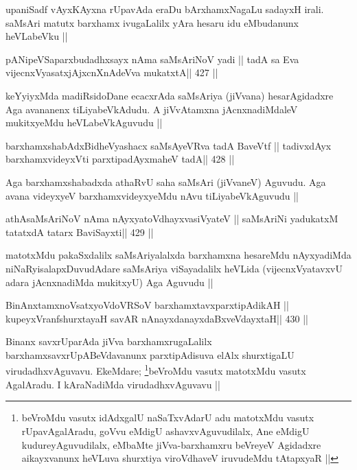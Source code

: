 \begin{artha}
upaniSadf vAyxKAyxna rUpavAda eraDu bArxhamxNagaLu sadayxH irali.
saMsAri matutx barxhamx ivugaLalilx yAra hesaru idu eMbudanunx
heVLabeVku ||
\end{artha}

\begin{shl}
pANipeVSaparxbudadhxsayx nAma saMsAriNoV yadi ||
tadA sa Eva vijecnxVyasatxjAjxcnXnAdeVva mukatxtA\hfill || 427 ||
\end{shl}

\begin{artha}
keYyiyxMda madiRsidoDane ecacxrAda saMsAriya (jiVvana) hesarAgidadxre
Aga avananenx tiLiyabeVkAdudu. A jiVvAtamxna jAcnxnadiMdaleV
mukitxyeMdu heVLabeVkAguvudu || 
\end{artha}


\begin{shl}
barxhamxshabAdxBidheVyashacx saMsAyeVRva tadA BaveVtf ||
tadivxdAyx barxhamxvideyxVti parxtipadAyxmaheV tadA\hfill || 428 ||
\end{shl}

\begin{artha}
Aga barxhamxshabadxda athaRvU saha saMsAri (jiVvaneV) Aguvudu. Aga
avana videyxyeV barxhamxvideyxyeMdu nAvu tiLiyabeVkAguvudu ||
\end{artha}

\begin{shl}
athAsaMsAriNoV nAma nAyxyatoV\s dhayxvasiVyateV ||
saMsAriNi yadukatxM tatatxdA tatarx BaviSayxti\hfill || 429 ||
\end{shl}

\begin{artha}
matotxMdu pakaSxdalilx saMsAriyalalxda barxhamxna hesareMdu
nAyxyadiMda niNaRyisalapxDuvudAdare saMsAriya viSayadalilx heVLida
(vijecnxVyatavxvU adara jAcnxnadiMda mukitxyU) Aga Aguvudu ||
\end{artha}




\begin{shl}
BinAnxtamxnoVsatxyoVdoVRSoV barxhamxtavxparxtipAdikAH ||
kupeyxVranfshurxtayaH savAR nAnayxdanayxdaBxveVdayxtaH\hfill || 430 ||
\end{shl}

\begin{artha}
Binanx savxrUparAda jiVva barxhamxrugaLalilx barxhamxsavxrUpABeVdavanunx
parxtipAdisuva elAlx shurxtigaLU virudadhxvAguvavu. EkeMdare; 
\footnote[1]{beVroMdu vasutx idAdxgalU naSaTxvAdarU adu matotxMdu vasutx
rUpavAgalAradu, goVvu eMdigU ashavxvAguvudilalx, Ane eMdigU
kudureyAguvudilalx, eMbaMte jiVva-barxhamxru beVreyeV Agidadxre
aikayxvanunx heVLuva shurxtiya viroVdhaveV iruvudeMdu tAtapxyaR ||}beVroMdu
vasutx matotxMdu vasutx AgalAradu. I kAraNadiMda virudadhxvAguvavu ||
\end{artha}

